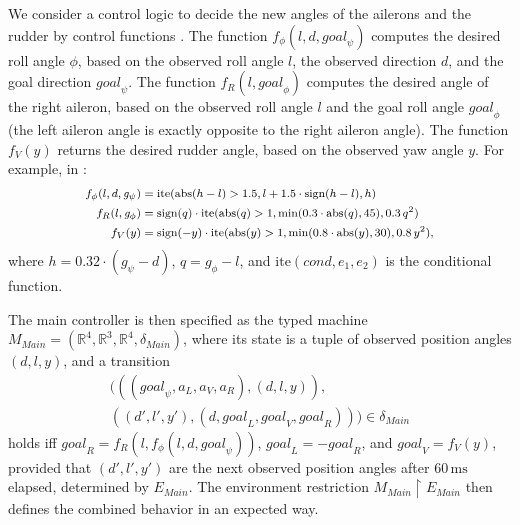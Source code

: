 \documentclass{sig-alternate}
\newcommand{\abs}{\ensuremath{\mathrm{abs}}}
\newcommand{\sign}{\ensuremath{\mathrm{sign}}}
\begin{document}
We consider a control logic to decide 
the new angles of the ailerons and the rudder
by control functions \cite{ftscs-journal}.
%
The function $f_\phi(l, d, \mathit{goal}_\psi)$
computes the desired roll angle $\phi$,
 based on 
the observed roll angle $l$, the observed direction $d$, and 
the goal direction $\mathit{goal}_\psi$.
%
The function
 $f_{R}(l, \mathit{goal}_\phi)$
computes the desired angle of the right aileron,
based on the observed roll angle $l$ and the goal roll angle $\mathit{goal}_\phi$
(the left aileron angle is %
exactly opposite to the right aileron angle).
%
The function $f_V(y)$ returns the desired rudder angle,
based on the observed yaw angle $y$. %
For example,
in \cite{ftscs-journal}:
\[
\begin{medsize}
\begin{aligned}
f_\phi(l, d, \mathit{g}_\psi) &= 
\mathrm{ite}(\abs(h - l) > 1.5, l +  1.5 \cdot\sign(h-l), h)
\\
f_{R}(l, \mathit{g}_\phi) &=
\sign(q)\cdot \mathrm{ite}(\abs(q) > 1, \min(0.3 \cdot \abs(q), 45), 0.3 \, q^2)
\\
f_V(y) &=
\begin{aligned}[t]
\sign(-y)\cdot \mathrm{ite}(\abs(y) > 1, \min(0.8 \cdot \abs(y), 30), 0.8 \, y^2),
\end{aligned}
\end{aligned}
\end{medsize}
\]
where $h = 0.32 \cdot (\mathit{g}_\psi - d)$,
$q = \mathit{g}_\phi - l$,
and $\mathrm{ite}(\mathit{cond},e_1,e_2)$ is the conditional function.


The main controller is then specified 
as the typed machine $M_\mathit{Main} = (\mathbb{R}^4, \mathbb{R}^3, \mathbb{R}^4, \delta_\mathit{Main})$,
where
its state is a tuple of observed position angles $(d, l, y)$,
and a transition
\[
\begin{multlined}
(((\mathit{goal}_\psi, a_L, a_V, a_R), (d,l,y)), 
\\
((d', l', y'), (d, \mathit{goal}_L, \mathit{goal}_V, \mathit{goal}_R))) \in \delta_\mathit{Main}
\end{multlined}
\] 
holds iff 
$\mathit{goal}_R = f_{R}(l, f_\phi(l, d, \mathit{goal}_\psi))$,
$\mathit{goal}_L = - \mathit{goal}_R$, and
$\mathit{goal}_V = f_V(y)$,
provided that $(d', l', y')$ are the next observed position angles 
after $60\,\mathrm{ms}$ elapsed,
determined by $E_\mathit{Main}$.
The environment restriction $M_\mathit{Main} \restriction E_\mathit{Main}$
then defines the combined behavior in an expected way.
\end{document}
